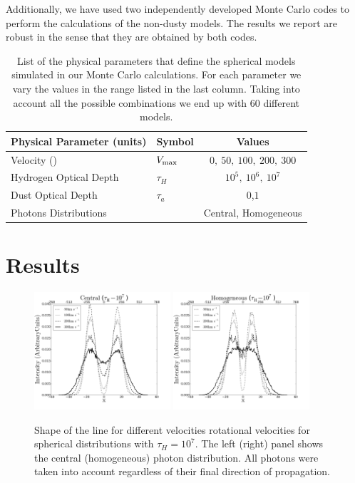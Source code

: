 \documentclass{emulateapj}
\newcommand{\ly}{{\ifmmode{{\rm Ly}\alpha~}\else{Ly$\alpha$~}\fi}}
\newcommand{\kms}{{\ifmmode{{\mathrm{\,km\ s}^{-1}}}\else{\,km~s$^{-1}$}\fi}}
\begin{document}
Additionally, we have used two independently developed Monte Carlo
codes \citep{CLARA,DijkstraKramer} to perform the calculations of the
non-dusty models. The results we report are robust in the sense
that they are obtained by both codes. 

\begin{table}
\begin{center}
\begin{tabular}{llc}\hline\hline
Physical Parameter (units) & Symbol & Values\\\hline
Velocity (\kms) & $V_{\rm max}$&$0,\ 50,\ 100,\ 200,\ 300$\\
Hydrogen Optical Depth & $\tau_{H} $ & $10^{5},\ 10^{6},\ 10^{7}$\\
Dust Optical Depth & $\tau_{a}$ & $0$,$1$\\
Photons Distributions & & Central, Homogeneous\\\hline\hline
\end{tabular}
\caption{
  List of the physical parameters that define the spherical models 
  simulated in our Monte Carlo calculations. For each parameter we
  vary the values in the range listed in the last column. Taking into
  account all the possible combinations we end up with $60$ different
  models.} 
\label{table:models}
\end{center}
\end{table}


\section{Results}
\label{sec:results}

\begin{figure}
  \includegraphics[width=0.45\textwidth]{SpectraDifVelocitiesCentral.png}
  \includegraphics[width=0.45\textwidth]{SpectraDifVelocitiesHOM.png}
\caption{Shape of the \ly line for
    different velocities rotational velocities for spherical
    distributions with $\tau_{H}=10^{7}$. The left (right) panel shows
    the central (homogeneous) photon distribution. All photons were
    taken into  account regardless of their final direction of propagation.
    \label{fig:differentvelocities}}  
\end{figure}
\end{document}
